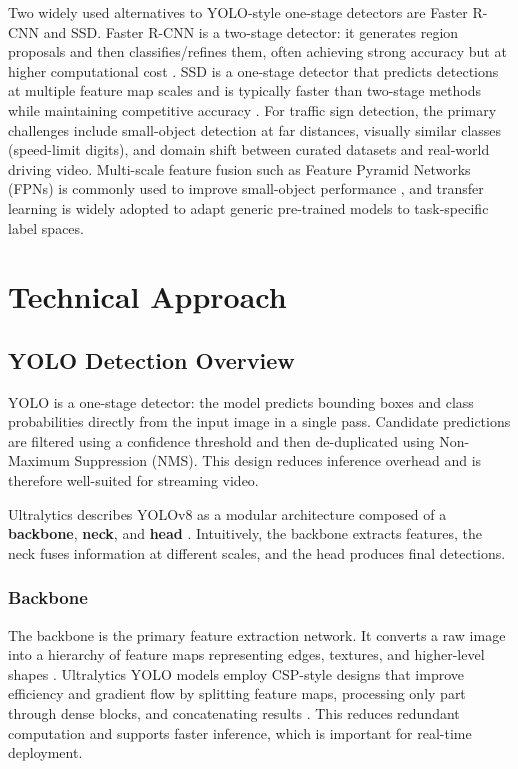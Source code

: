 \documentclass[conference]{IEEEtran}
\begin{document}
Two widely used alternatives to YOLO-style one-stage detectors are Faster R-CNN and SSD. Faster R-CNN is a two-stage detector: it generates region proposals and then classifies/refines them, often achieving strong accuracy but at higher computational cost \cite{faster_rcnn}. SSD is a one-stage detector that predicts detections at multiple feature map scales and is typically faster than two-stage methods while maintaining competitive accuracy \cite{SSD}. For traffic sign detection, the primary challenges include small-object detection at far distances, visually similar classes (speed-limit digits), and domain shift between curated datasets and real-world driving video. Multi-scale feature fusion such as Feature Pyramid Networks (FPNs) is commonly used to improve small-object performance \cite{FPN}, and transfer learning is widely adopted to adapt generic pre-trained models to task-specific label spaces.

\section{Technical Approach}

\subsection{YOLO Detection Overview}
YOLO is a one-stage detector: the model predicts bounding boxes and class probabilities directly from the input image in a single pass. Candidate predictions are filtered using a confidence threshold and then de-duplicated using Non-Maximum Suppression (NMS). This design reduces inference overhead and is therefore well-suited for streaming video.

Ultralytics describes YOLOv8 as a modular architecture composed of a \textbf{backbone}, \textbf{neck}, and \textbf{head} \cite{viso_yolov8}. Intuitively, the backbone extracts features, the neck fuses information at different scales, and the head produces final detections.

\subsubsection{Backbone}
The backbone is the primary feature extraction network. It converts a raw image into a hierarchy of feature maps representing edges, textures, and higher-level shapes \cite{backbone}. Ultralytics YOLO models employ CSP-style designs that improve efficiency and gradient flow by splitting feature maps, processing only part through dense blocks, and concatenating results \cite{CSPNet}. This reduces redundant computation and supports faster inference, which is important for real-time deployment.
\end{document}
